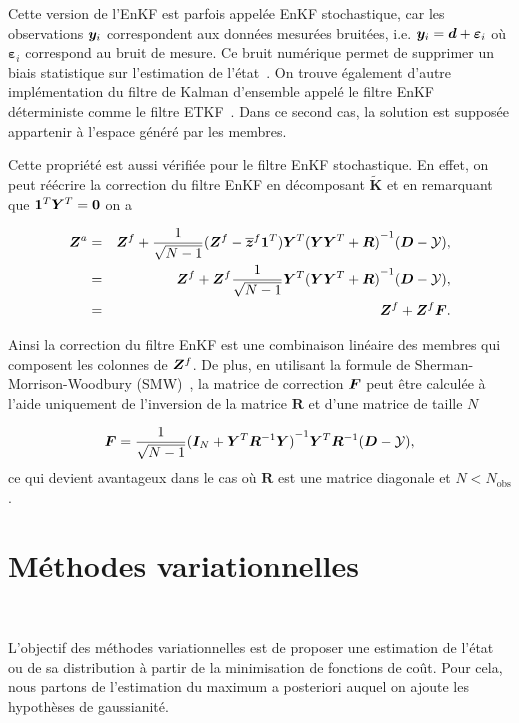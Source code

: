 Cette version de l'EnKF est parfois appelée EnKF stochastique, car les observations $\bm{y}_i$ correspondent aux données mesurées bruitées, i.e. $\bm{y}_i = \bm{d} + \bm \varepsilon_i$ où $\bm \varepsilon_i$ correspond au bruit de mesure. Ce bruit numérique permet de supprimer un biais statistique sur l'estimation de l'état~\cite{van_leeuwen_consistent_2020}. On trouve également d'autre implémentation du filtre de Kalman d'ensemble appelé le filtre EnKF déterministe comme le filtre ETKF~\cite{bishop_adaptive_2001, Hunt2007}. Dans ce second cas, la solution est supposée appartenir à l'espace généré par les membres.

Cette propriété est aussi vérifiée pour le filtre EnKF stochastique. En effet, on peut réécrire la correction du filtre EnKF en décomposant $\tilde{\bm{K}}$ et en remarquant que $\bm 1^T \bm Y^T = \bm 0$ on a

\begin{eqnarray*}
    \bm{Z}^a &=& \bm{Z}^f + \frac{1}{\sqrt{N - 1}}(\bm Z^f - \overline{\bm{z}}^f \bm{1}^T)\bm Y^T {(\bm Y \bm Y^T + \bm R)}^{-1} ( \bm{D} - \mathcal{Y}), \\
    &=& \bm{Z}^f +\bm Z^f  \frac{1}{\sqrt{N - 1}}\bm Y^T {(\bm Y \bm Y^T + \bm R)}^{-1} ( \bm{D} - \mathcal{Y}), \\
    &=& \bm{Z}^f +\bm Z^f \bm{F}.
\end{eqnarray*}

Ainsi la correction du filtre EnKF est une combinaison linéaire des membres qui composent les colonnes de $\bm{Z}^f$. De plus, en utilisant la formule de Sherman-Morrison-Woodbury (SMW)~\cite{SMW}, la matrice de correction $\bm{F}$ peut être calculée à l'aide uniquement de l'inversion de la matrice $\bm R$ et d'une matrice de taille $N$

\begin{eqnarray*}
    \bm{F} = \frac{1}{\sqrt{N - 1}} {(\bm I_N + \bm Y^T\bm R^{-1}\bm Y)}^{-1}\bm Y^T \bm R^{-1} (\bm{D} - \mathcal{Y}),
\end{eqnarray*}ce qui devient avantageux dans le cas où $\bm R$ est une matrice diagonale et $N < N_{\text{obs}}$.

\section{Méthodes variationnelles}~\label{sec:variation}

L'objectif des méthodes variationnelles est de proposer une estimation de l'état ou de sa distribution à partir de la minimisation de fonctions de coût. Pour cela, nous partons de l'estimation du maximum a posteriori auquel on ajoute les hypothèses de gaussianité.

